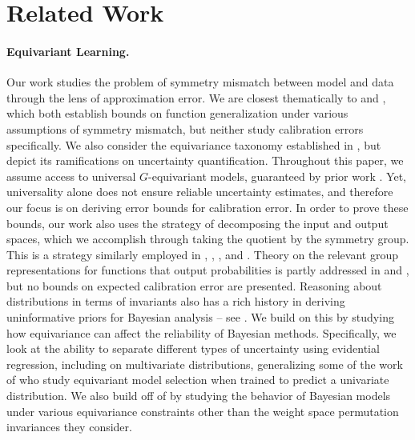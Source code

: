 \documentclass[10pt]{article} %
\theoremstyle{definition}
\begin{document}
\section{Related Work}

\paragraph{Equivariant Learning.} Our work studies the problem of symmetry mismatch between model and data through the lens of approximation error. We are closest thematically to \cite{petrache2023approximation} and \cite{wang2024general}, which both establish bounds on function generalization under various assumptions of symmetry mismatch, but neither study calibration errors specifically. We also consider the equivariance taxonomy established in \cite{wang2024general}, but depict its ramifications on uncertainty quantification. Throughout this paper, we assume access to universal $G$-equivariant models, guaranteed by prior work \citep{maron2019universality, yarotsky2022universal}. Yet, universality alone does not ensure reliable uncertainty estimates, and therefore our focus is on deriving error bounds for calibration error. In order to prove these bounds, our work also uses the strategy of decomposing the input and output spaces, which we accomplish through taking the quotient by the symmetry group. This is a strategy similarly employed in \cite{sannai2021improved}, \cite{lawrence2022barron}, \cite{petrache2023approximation}, and \cite{wang2024general}.  Theory on the relevant group representations for functions that output probabilities is partly addressed in \cite{bloem2020probabilistic} and \cite{dobriban2025symmpi}, but no bounds on expected calibration error are presented. Reasoning about distributions in terms of invariants also has a rich history in deriving uninformative priors for Bayesian analysis -- see \cite{jaynes1968prior}. We build on this by studying how equivariance can affect the reliability of Bayesian methods. Specifically, we look at the ability to separate different types of uncertainty using evidential regression, including on multivariate distributions, generalizing some of the work of \cite{van2025equivariant} who study equivariant model selection when trained to predict a univariate distribution. We also build off of \cite{gelberg2024variational} by studying the behavior of Bayesian models under various equivariance constraints other than the weight space permutation invariances they consider.
\end{document}
